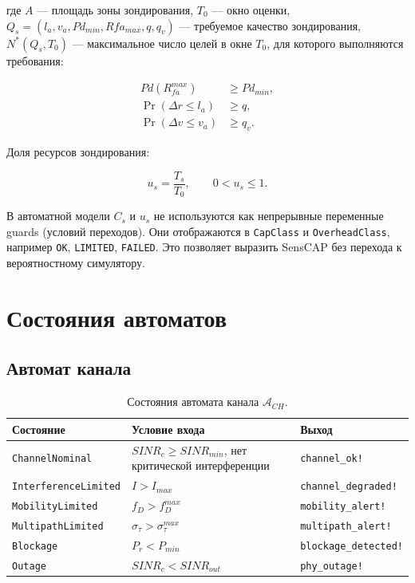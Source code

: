 \documentclass[12pt,a4paper]{article}
\begin{document}
где $A$ --- площадь зоны зондирования, $T_0$ --- окно оценки, $Q_s=(l_a,v_a,Pd_{min},Rfa_{max},q,q_v)$ --- требуемое качество зондирования, $N^*(Q_s,T_0)$ --- максимальное число целей в окне $T_0$, для которого выполняются требования:

\begin{equation}
\begin{aligned}
Pd(R_{fa}^{max}) &\ge Pd_{min},\\
\Pr(\Delta r\le l_a) &\ge q,\\
\Pr(\Delta v\le v_a) &\ge q_v.
\end{aligned}
\end{equation}

Доля ресурсов зондирования:

\begin{equation}
u_s=\frac{T_s}{T_0},\qquad 0<u_s\le 1.
\end{equation}

В автоматной модели $C_s$ и $u_s$ не используются как непрерывные переменные guards (условий переходов). Они отображаются в \texttt{CapClass} и \texttt{OverheadClass}, например \texttt{OK}, \texttt{LIMITED}, \texttt{FAILED}. Это позволяет выразить SensCAP без перехода к вероятностному симулятору.

\section{Состояния автоматов}

\subsection{Автомат канала}

\begin{table}[htbp]
\centering
\small
\setlength{\tabcolsep}{4pt}
\begin{tabularx}{\textwidth}{p{}YY}
\toprule
Состояние & Условие входа & Выход \\
\midrule
\texttt{ChannelNominal} & $SINR_c \ge SINR_{min}$, нет критической интерференции & \texttt{channel\_ok!} \\
\texttt{InterferenceLimited} & $I>I_{max}$ & \texttt{channel\_degraded!} \\
\texttt{MobilityLimited} & $f_D>f_D^{max}$ & \texttt{mobility\_alert!} \\
\texttt{MultipathLimited} & $\sigma_\tau>\sigma_\tau^{max}$ & \texttt{multipath\_alert!} \\
\texttt{Blockage} & $P_r<P_{min}$ & \texttt{blockage\_detected!} \\
\texttt{Outage} & $SINR_c<SINR_{out}$ & \texttt{phy\_outage!} \\
\bottomrule
\end{tabularx}
\caption{Состояния автомата канала $\mathcal{A}_{CH}$.}
\label{tab:channel_states}
\end{table}
\end{document}

